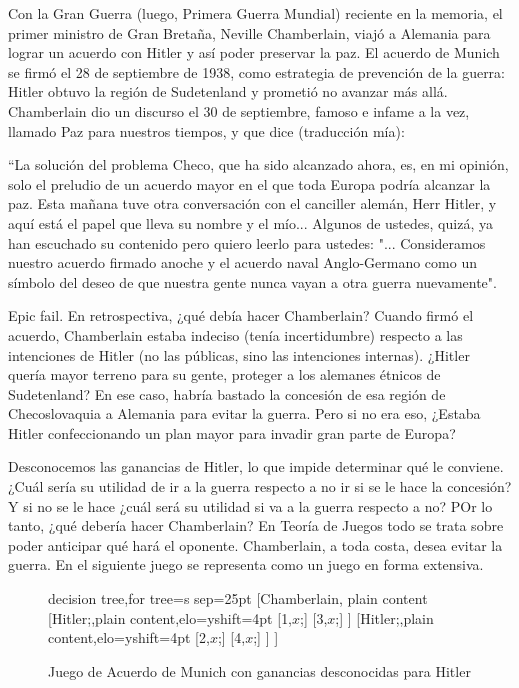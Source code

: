 \documentclass[12pt]{article}
\begin{document}
Con la Gran Guerra (luego, Primera Guerra Mundial) reciente en la memoria, el primer ministro de Gran Bretaña, Neville Chamberlain, viajó a Alemania para lograr un acuerdo con Hitler y así poder preservar la paz. El acuerdo de Munich se firmó el 28 de septiembre de 1938, como estrategia de prevención de la guerra: Hitler obtuvo la región de Sudetenland y prometió no avanzar más allá. Chamberlain dio un discurso el 30 de septiembre, famoso e infame a la vez, llamado Paz para nuestros tiempos, y que dice (traducción mía):

``La solución del problema Checo, que ha sido alcanzado ahora, es, en mi opinión, solo el preludio de un acuerdo mayor en el que toda Europa podría alcanzar la paz. Esta mañana tuve otra conversación con el canciller alemán, Herr Hitler, y aquí está el papel que lleva su nombre y el mío... Algunos de ustedes, quizá, ya han escuchado su contenido pero quiero leerlo para ustedes: "... Consideramos nuestro acuerdo firmado anoche y el acuerdo naval Anglo-Germano como un símbolo del deseo de que nuestra gente nunca vayan a otra guerra nuevamente".

Epic fail. En retrospectiva, ¿qué debía hacer Chamberlain? Cuando firmó el acuerdo, Chamberlain estaba indeciso (tenía incertidumbre) respecto a las intenciones de Hitler (no las públicas, sino las intenciones internas). ¿Hitler quería mayor terreno para su gente, proteger a los alemanes étnicos de Sudetenland? En ese caso, habría bastado la concesión de esa región de Checoslovaquia a Alemania para evitar la guerra. Pero si no era eso, ¿Estaba Hitler confeccionando un plan mayor para invadir gran parte de Europa?

Desconocemos las ganancias de Hitler, lo que impide determinar qué le conviene. ¿Cuál sería su utilidad de ir a la guerra respecto a no ir si se le hace la concesión? Y si no se le hace ¿cuál será su utilidad si va a la guerra respecto a no? POr lo tanto, ¿qué debería hacer Chamberlain? En Teoría de Juegos todo se trata sobre poder anticipar qué hará el oponente. Chamberlain, a toda costa, desea evitar la guerra. En el siguiente juego se representa como un juego en forma extensiva.

\begin{figure}[H]
	\centering
	\footnotesize{
		\begin{forest} decision tree,for tree={s sep=25pt}
				[Chamberlain, plain content
						[Hitler;,plain content,elo={yshift=4pt}
								[{1,$x$};]
								[{3,$x$};]
						]
						[Hitler;,plain content,elo={yshift=4pt}
								[{2,$x$};]
								[{4,$x$};]
						]
				]
		\end{forest}}
	\caption{Juego de Acuerdo de Munich con ganancias desconocidas para Hitler}
\end{figure}
\end{document}
